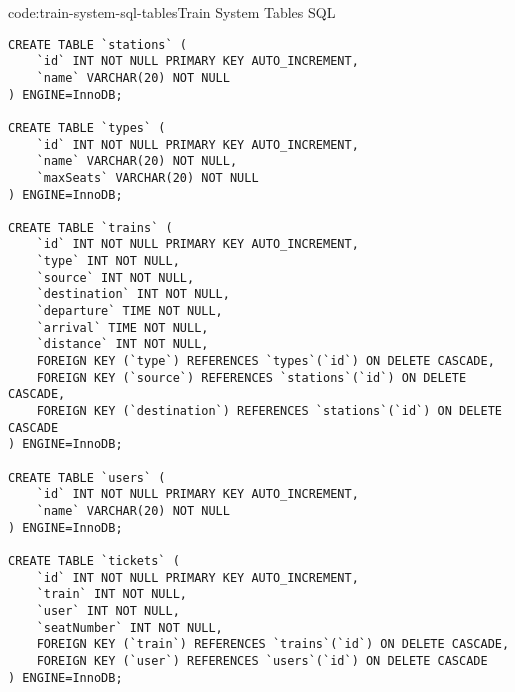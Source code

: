 \begin{codeenv}{code:train-system-sql-tables}{Train System Tables SQL}
\begin{verbatim}
CREATE TABLE `stations` (
    `id` INT NOT NULL PRIMARY KEY AUTO_INCREMENT,
    `name` VARCHAR(20) NOT NULL
) ENGINE=InnoDB;

CREATE TABLE `types` (
    `id` INT NOT NULL PRIMARY KEY AUTO_INCREMENT,
    `name` VARCHAR(20) NOT NULL,
    `maxSeats` VARCHAR(20) NOT NULL
) ENGINE=InnoDB;

CREATE TABLE `trains` (
    `id` INT NOT NULL PRIMARY KEY AUTO_INCREMENT,
    `type` INT NOT NULL,
    `source` INT NOT NULL,
    `destination` INT NOT NULL,
    `departure` TIME NOT NULL,
    `arrival` TIME NOT NULL,
    `distance` INT NOT NULL,
    FOREIGN KEY (`type`) REFERENCES `types`(`id`) ON DELETE CASCADE,
    FOREIGN KEY (`source`) REFERENCES `stations`(`id`) ON DELETE CASCADE,
    FOREIGN KEY (`destination`) REFERENCES `stations`(`id`) ON DELETE CASCADE
) ENGINE=InnoDB;

CREATE TABLE `users` (
    `id` INT NOT NULL PRIMARY KEY AUTO_INCREMENT,
    `name` VARCHAR(20) NOT NULL
) ENGINE=InnoDB;

CREATE TABLE `tickets` (
    `id` INT NOT NULL PRIMARY KEY AUTO_INCREMENT,
    `train` INT NOT NULL,
    `user` INT NOT NULL,
    `seatNumber` INT NOT NULL,
    FOREIGN KEY (`train`) REFERENCES `trains`(`id`) ON DELETE CASCADE,
    FOREIGN KEY (`user`) REFERENCES `users`(`id`) ON DELETE CASCADE
) ENGINE=InnoDB;
\end{verbatim}
\end{codeenv}
\newpage

